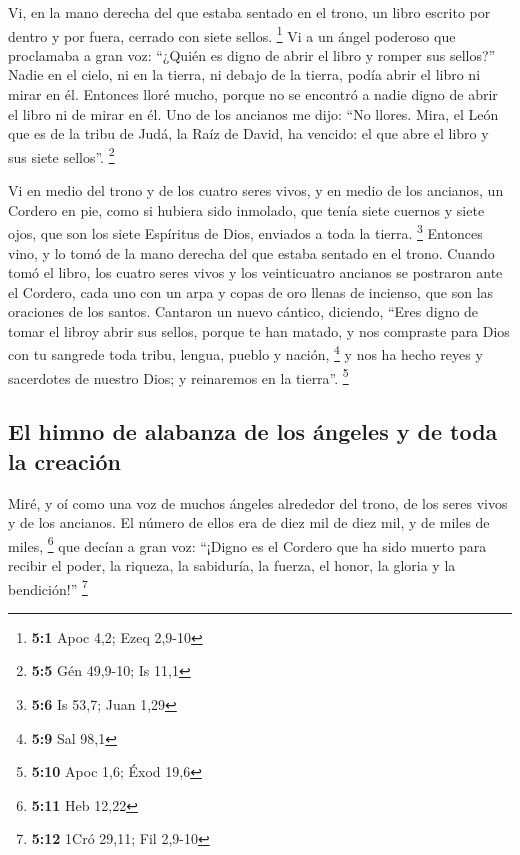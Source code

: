 \begin{paracol}{2}
 Vi, en la mano derecha del que estaba sentado en el
trono, un libro escrito por dentro y por fuera, cerrado con siete
sellos. \footnote{\textbf{5:1} Apoc 4,2; Ezeq 2,9-10}  Vi
a un ángel poderoso que proclamaba a gran voz: ``¿Quién es digno de
abrir el libro y romper sus sellos?''  Nadie en el cielo,
ni en la tierra, ni debajo de la tierra, podía abrir el libro ni mirar
en él.  Entonces lloré mucho, porque no se encontró a
nadie digno de abrir el libro ni de mirar en él.  Uno de
los ancianos me dijo: ``No llores. Mira, el León que es de la tribu de
Judá, la Raíz de David, ha vencido: el que abre el libro y sus siete
sellos''. \footnote{\textbf{5:5} Gén 49,9-10; Is 11,1}

 Vi en medio del trono y de los cuatro seres vivos, y en
medio de los ancianos, un Cordero en pie, como si hubiera sido inmolado,
que tenía siete cuernos y siete ojos, que son los siete Espíritus de
Dios, enviados a toda la tierra. \footnote{\textbf{5:6} Is 53,7; Juan
  1,29}  Entonces vino, y lo tomó de la mano derecha del
que estaba sentado en el trono.  Cuando tomó el libro, los
cuatro seres vivos y los veinticuatro ancianos se postraron ante el
Cordero, cada uno con un arpa y copas de oro llenas de incienso, que son
las oraciones de los santos.  Cantaron un nuevo cántico,
diciendo, ``Eres digno de tomar el libroy abrir sus sellos, porque te
han matado, y nos compraste para Dios con tu sangrede toda tribu,
lengua, pueblo y nación, \footnote{\textbf{5:9} Sal 98,1}
 y nos ha hecho reyes y sacerdotes de nuestro Dios; y
reinaremos en la tierra''. \footnote{\textbf{5:10} Apoc 1,6; Éxod 19,6}

\hypertarget{el-himno-de-alabanza-de-los-uxe1ngeles-y-de-toda-la-creaciuxf3n}{%
\subsection{El himno de alabanza de los ángeles y de toda la
creación}\label{el-himno-de-alabanza-de-los-uxe1ngeles-y-de-toda-la-creaciuxf3n}}

 Miré, y oí como una voz de muchos ángeles alrededor del
trono, de los seres vivos y de los ancianos. El número de ellos era de
diez mil de diez mil, y de miles de miles, \footnote{\textbf{5:11} Heb
  12,22}  que decían a gran voz: ``¡Digno es el Cordero
que ha sido muerto para recibir el poder, la riqueza, la sabiduría, la
fuerza, el honor, la gloria y la bendición!'' \footnote{\textbf{5:12}
  1Cró 29,11; Fil 2,9-10}


\end{paracol}

